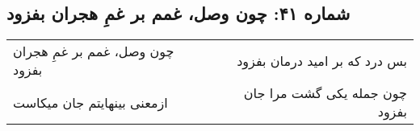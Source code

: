 \begin{center}
\section*{شماره ۴۱: چون وصل، غمم بر غمِ هجران بفزود}
\label{sec:041}
\begin{longtable}{l p{0.5cm} r}
چون وصل، غمم بر غمِ هجران بفزود
&&
بس درد که بر امید درمان بفزود
\\
ازمعنی بینهایتم جان میکاست
&&
چون جمله یکی گشت مرا جان بفزود
\\
\end{longtable}
\end{center}
